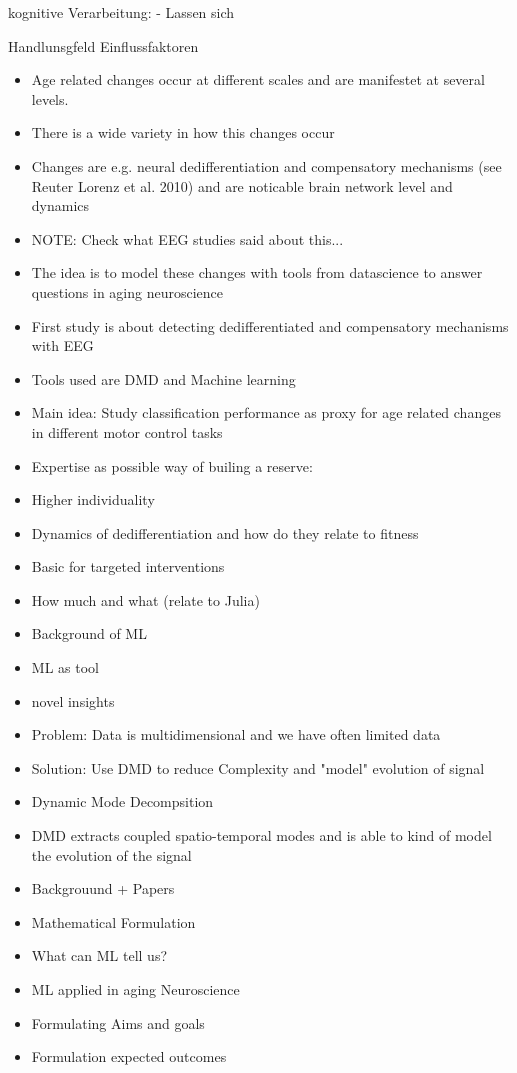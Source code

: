 kognitive Verarbeitung: 
- Lassen sich 

Handlunsgfeld Einflussfaktoren 




\begin{itemize}
    \item Age related changes occur at different scales and are manifestet at several levels.
    \item There is a wide variety in how this changes occur
    \item Changes are e.g. neural dedifferentiation and compensatory mechanisms (see Reuter Lorenz et al. 2010) and are noticable brain network level and dynamics
    \item NOTE: Check what EEG studies said about this...
    \item The idea is to model these changes with tools from datascience to answer questions in aging neuroscience
    \item First study is about detecting dedifferentiated and compensatory mechanisms with EEG
    \item Tools used are DMD and Machine learning
    \item Main idea: Study classification performance as proxy for age related changes in different motor control tasks
    \item Expertise as possible way of builing a reserve:
    \item Higher individuality 
    \item Dynamics of dedifferentiation and how do they relate to fitness
    \item Basic for targeted interventions 
    \item How much and what (relate to Julia)
    \item Background of ML
    \item ML as tool 
    \item novel insights 
    \item Problem: Data is multidimensional and we have often limited data 
    \item Solution: Use DMD to reduce Complexity and "model" evolution of signal 
    \item Dynamic Mode Decompsition
    \item DMD extracts coupled spatio-temporal modes and is able to kind of model the evolution of the signal 
    \item Backgrouund + Papers 
    \item Mathematical Formulation
    \item What can ML tell us?
    \item ML applied in aging Neuroscience
    \item Formulating Aims and goals 
    \item Formulation expected outcomes
\end{itemize}
